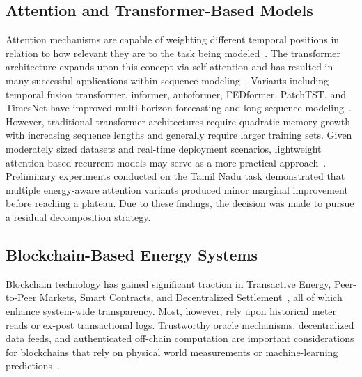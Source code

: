 \documentclass{ieeeaccess}
\begin{document}
\subsection{Attention and Transformer-Based Models}
Attention mechanisms are capable of weighting different temporal positions in relation to how relevant they are to the task being modeled~\cite{bahdanau,luong}. The transformer architecture expands upon this concept via self-attention and has resulted in many successful applications within sequence modeling~\cite{vaswani}. Variants including temporal fusion transformer, informer, autoformer, FEDformer, PatchTST, and TimesNet have improved multi-horizon forecasting and long-sequence modeling~\cite{lim,zhou_informer,wu_autoformer,zhou_fedformer,nie,wu_timesnet}. However, traditional transformer architectures require quadratic memory growth with increasing sequence lengths and generally require larger training sets. Given moderately sized datasets and real-time deployment scenarios, lightweight attention-based recurrent models may serve as a more practical approach~\cite{li_attention_access,gao_attention_access,zhou_wind_bilstm_access}. Preliminary experiments conducted on the Tamil Nadu task demonstrated that multiple energy-aware attention variants produced minor marginal improvement before reaching a plateau. Due to these findings, the decision was made to pursue a residual decomposition strategy.

\subsection{Blockchain-Based Energy Systems}
Blockchain technology has gained significant traction in Transactive Energy, Peer-to-Peer Markets, Smart Contracts, and Decentralized Settlement~\cite{andoni,mengelkamp,aitzhan,li_consortium,kang,noor,mollah,szabo,buterin,tushar_access,wang_blockchain_access}, all of which enhance system-wide transparency. Most, however, rely upon historical meter reads or ex-post transactional logs. Trustworthy oracle mechanisms, decentralized data feeds, and authenticated off-chain computation are important considerations for blockchains that rely on physical world measurements or machine-learning predictions~\cite{albreiki,chainlink,zhang_towncrier,kosba,taghavi}.
\end{document}
